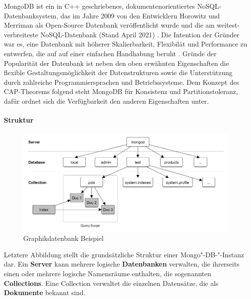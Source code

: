MongoDB ist ein in C++ geschriebenes, dokumentenorientiertes NoSQL-Datenbanksystem, das im Jahre 2009 von den Entwicklern Horowitz und Merriman als Open-Source Datenbank veröffentlicht wurde und die am weitest-verbreiteste NoSQL-Datenbank (Stand April 2021) \cite{DB1.7}. Die Intention der Gründer war es, eine Datenbank mit höherer Skalierbarkeit, Flexibilät und Performance zu entwerfen, die auf auf einer einfachen Handhabung beruht \cite{DB1.65}.
Gründe der Popularität der Datenbank ist neben den oben erwähnten Eigenschaften die flexible Gestaltungsmöglichkeit der Datenstrukturen sowie die Unterstützung durch zahlreiche Programmiersprachen und Betriebssysteme.
\noindent
Dem Konzept des CAP-Theorems folgend steht MongoDB für Konsistenz und Partitionstoleranz, dafür ordnet sich die Verfügbarkeit den anderen Eigenschaften unter.
\newline

\paragraph{Struktur}

\begin{figure}[htb]
\centering
\includegraphics[width=14cm]{images/MongoDB_Architektur.png}
\caption{Graphikdatenbank Beispiel \protect \footnotemark}
\end{figure}

\noindent
Letztere Abbildung stellt die grundsätzliche Struktur einer Mongo"-DB-"-Instanz dar.
Ein \textbf{Server} kann mehrere logische \textbf{Datenbanken} verwalten, die ihrerseits einen oder mehrere logische Namensräume enthalten, die sogenannten \textbf{Collections}. Eine Collection verwaltet die einzelnen Datensätze, die als \textbf{Dokumente} bekannt sind. 
\newline

